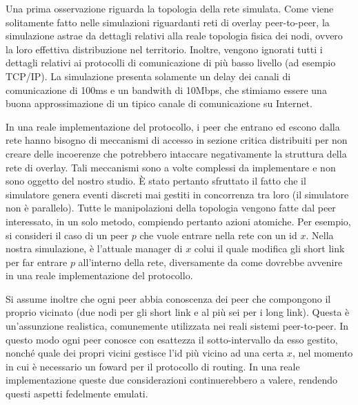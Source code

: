 \documentclass[prodmode,acmtap]{acmlarge}
\begin{document}
Una prima osservazione riguarda la topologia della rete simulata. Come viene solitamente fatto nelle simulazioni riguardanti reti di overlay peer-to-peer, la simulazione astrae da dettagli relativi alla reale topologia fisica dei nodi, ovvero la loro effettiva distribuzione nel territorio. Inoltre, vengono ignorati tutti i dettagli relativi ai protocolli di comunicazione di più basso livello (ad esempio TCP/IP). La simulazione presenta solamente un delay dei canali di comunicazione di 100ms e un bandwith di 10Mbps, che stimiamo essere una buona approssimazione di un tipico canale di comunicazione su Internet.


In una reale implementazione del protocollo, i peer che entrano ed escono dalla rete hanno bisogno di meccanismi di accesso in sezione critica distribuiti per non creare delle incoerenze che potrebbero intaccare negativamente la struttura della rete di overlay. Tali meccanismi sono a volte complessi da implementare e non sono oggetto del nostro studio. È stato pertanto sfruttato il fatto che il simulatore genera eventi discreti mai gestiti in concorrenza tra loro (il simulatore non è parallelo). Tutte le manipolazioni della topologia vengono fatte dal peer interessato, in un solo metodo, compiendo pertanto azioni atomiche. Per esempio, si consideri il caso di un peer $p$ che vuole entrare nella rete con un id $x$. Nella nostra simulazione, è l'attuale manager di $x$ colui il quale modifica gli short link per far entrare $p$ all'interno della rete, diversamente da come dovrebbe avvenire in una reale implementazione del protocollo.

Si assume inoltre che ogni peer abbia conoscenza dei peer che compongono il proprio vicinato (due nodi per gli short link e al più sei per i long link). Questa è un'assunzione realistica, comunemente utilizzata nei reali sistemi peer-to-peer. In questo modo ogni peer conosce con esattezza il sotto-intervallo da esso gestito, nonché quale dei propri vicini gestisce l'id più vicino ad una certa $x$, nel momento in cui è necessario un foward per il protocollo di routing. In una reale implementazione queste due considerazioni continuerebbero a valere, rendendo questi aspetti fedelmente emulati.
\end{document}
